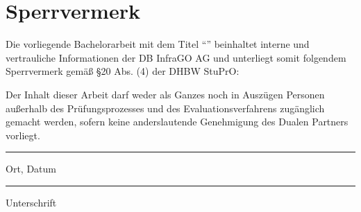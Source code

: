 \section*{Sperrvermerk}

Die vorliegende Bachelorarbeit mit dem Titel \enquote{\Titel} beinhaltet interne und vertrauliche Informationen der DB InfraGO AG und unterliegt somit folgendem Sperrvermerk gemäß §20 Abs. (4) der DHBW StuPrO:

Der Inhalt dieser Arbeit darf weder als Ganzes noch in Auszügen Personen außerhalb des Prüfungsprozesses und des Evaluationsverfahrens zugänglich gemacht werden, sofern keine anderslautende Genehmigung des Dualen Partners vorliegt.\\[1.5cm]


\begin{minipage}{\textwidth}
    \begin{minipage}[t]{0.4\textwidth}
        \begin{center}
            \hrule
            \vspace{1.5mm}
            Ort, Datum
        \end{center}
    \end{minipage}
    \hfill
    \begin{minipage}[t]{0.4\textwidth}
        \begin{center}
            \hrule
            \vspace{1.5mm}
            Unterschrift
        \end{center}
    \end{minipage}
\end{minipage}